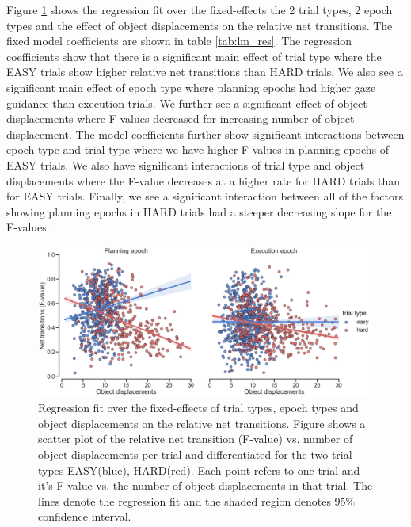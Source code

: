 Figure \ref{fig:F_regression} shows the regression fit over the fixed-effects the 2 trial types, 2 epoch types and the effect of object displacements on the relative net transitions. The fixed model coefficients are shown in table \ref{tab:lm_res}. The regression coefficients show that there is a significant main effect of trial type where the EASY trials show higher relative net transitions than HARD trials. We also see a significant main effect of epoch type where planning epochs had higher gaze guidance than execution trials. We further see a significant effect of object displacements where F-values decreased for increasing number of object displacement. The model coefficients further show significant interactions between epoch type and trial type where we have higher F-values in planning epochs of EASY trials. We also have significant interactions of trial type and object displacements where the F-value decreases at a higher rate for HARD trials than for EASY trials. Finally, we see a significant interaction between all of the factors showing planning epochs in HARD trials had a steeper decreasing slope for the F-values.  

\begin{figure}[h]
    \centering
    \includegraphics[width=0.9\linewidth]{source/figures/results/gaze_guidance_regression.png}
    \caption{Regression fit over the fixed-effects of trial types, epoch types and object displacements on the relative net transitions. Figure shows a scatter plot of the relative net transition (F-value) vs. number of object displacements per trial and differentiated for the two trial types EASY(blue), HARD(red). Each point refers to one trial and it's F value vs. the number of object displacements in that trial. The lines denote the regression fit and the shaded region denotes 95\% confidence interval.\\}
    \label{fig:F_regression}
\end{figure}

